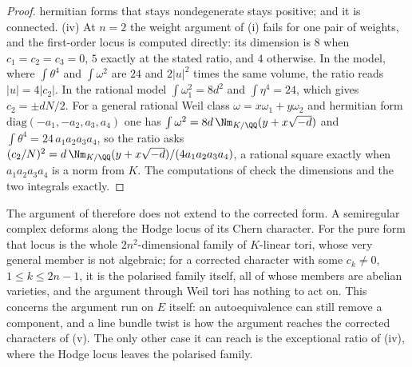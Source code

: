 \begin{proof}
hermitian forms that stays nondegenerate stays positive; and it is
connected. (iv) At $n=2$ the weight argument of
(i) fails for one pair of weights, and the
first-order locus is computed directly: its dimension is $8$ when
$c_{1}=c_{2}=c_{3}=0$, $5$ exactly at the stated ratio, and $4$ otherwise.
In the model, where $\int\theta^{4}$ and $\int\omega^{2}$ are $24$ and
$2|u|^{2}$ times the same volume, the ratio reads $|u|=4|c_{2}|$. In the
rational model $\int\omega_{1}^{2}=8d^{2}$ and $\int\eta^{4}=24$, which gives
$c_{2}=\pm dN/2$. For a general rational
Weil class $\omega=x\omega_{1}+y\omega_{2}$ and hermitian form
$\mathrm{diag}(-a_{1},-a_{2},a_{3},a_{4})$ one has
$\int\omega^{2}=8d\,\Nm_{K/\QQ}(y+x\sqrt{-d})$ and
$\int\theta^{4}=24\,a_{1}a_{2}a_{3}a_{4}$, so the ratio asks
$(c_{2}/N)^{2}=d\,\Nm_{K/\QQ}(y+x\sqrt{-d})/(4a_{1}a_{2}a_{3}a_{4})$, a rational
square exactly when $a_{1}a_{2}a_{3}a_{4}$ is a norm from $K$. The computations of \cite{BMB26} check the dimensions and the two integrals
exactly.
\end{proof}

The argument of  therefore does not extend to the
corrected form. A semiregular complex deforms along the Hodge locus of its
Chern character. For the pure form that locus is the whole
$2n^{2}$-dimensional family of $K$-linear tori, whose very general member is
not algebraic; for a corrected character with some $c_{k}\ne0$,
$1\le k\le2n-1$, it is the polarised family itself, all of whose members are
abelian varieties, and the argument through Weil tori has nothing to act on.
This concerns the argument run on $E$ itself: an autoequivalence can still
remove a component, and a line bundle twist is how the argument reaches the
corrected characters of (v). The only other case it
can reach is the exceptional ratio of (iv), where the Hodge locus leaves the
polarised family.

